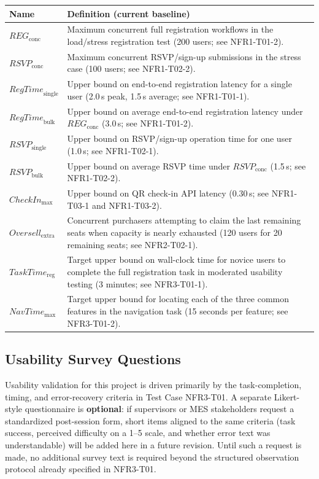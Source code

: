 \documentclass[12pt, titlepage]{article}
\begin{document}
\renewcommand{\arraystretch}{1.2}
\begin{tabular}{l p{9cm}}
  \toprule
  \textbf{Name} & \textbf{Definition (current baseline)} \\
  \midrule
  $\mathit{REG}_{\mathrm{conc}}$ & Maximum concurrent full registration workflows in the load/stress registration test (200 users; see NFR1-T01-2). \\
  $\mathit{RSVP}_{\mathrm{conc}}$ & Maximum concurrent RSVP/sign-up submissions in the stress case (100 users; see NFR1-T02-2). \\
  $\mathit{RegTime}_{\mathrm{single}}$ & Upper bound on end-to-end registration latency for a single user (2.0\,s peak, 1.5\,s average; see NFR1-T01-1). \\
  $\mathit{RegTime}_{\mathrm{bulk}}$ & Upper bound on average end-to-end registration latency under $\mathit{REG}_{\mathrm{conc}}$ (3.0\,s; see NFR1-T01-2). \\
  $\mathit{RSVP}_{\mathrm{single}}$ & Upper bound on RSVP/sign-up operation time for one user (1.0\,s; see NFR1-T02-1). \\
  $\mathit{RSVP}_{\mathrm{bulk}}$ & Upper bound on average RSVP time under $\mathit{RSVP}_{\mathrm{conc}}$ (1.5\,s; see NFR1-T02-2). \\
  $\mathit{CheckIn}_{\max}$ & Upper bound on QR check-in API latency (0.30\,s; see NFR1-T03-1 and NFR1-T03-2). \\
  $\mathit{Oversell}_{\mathrm{extra}}$ & Concurrent purchasers attempting to claim the last remaining seats when capacity is nearly exhausted (120 users for 20 remaining seats; see NFR2-T02-1). \\
  $\mathit{TaskTime}_{\mathrm{reg}}$ & Target upper bound on wall-clock time for novice users to complete the full registration task in moderated usability testing (3 minutes; see NFR3-T01-1). \\
  $\mathit{NavTime}_{\max}$ & Target upper bound for locating each of the three common features in the navigation task (15 seconds per feature; see NFR3-T01-2). \\
  \bottomrule
\end{tabular}

\subsection{Usability Survey Questions}

Usability validation for this project is driven primarily by the task-completion, timing, and error-recovery criteria in Test Case NFR3-T01. A separate Likert-style questionnaire is \textbf{optional}: if supervisors or MES stakeholders request a standardized post-session form, short items aligned to the same criteria (task success, perceived difficulty on a 1--5 scale, and whether error text was understandable) will be added here in a future revision. Until such a request is made, no additional survey text is required beyond the structured observation protocol already specified in NFR3-T01.
\end{document}
